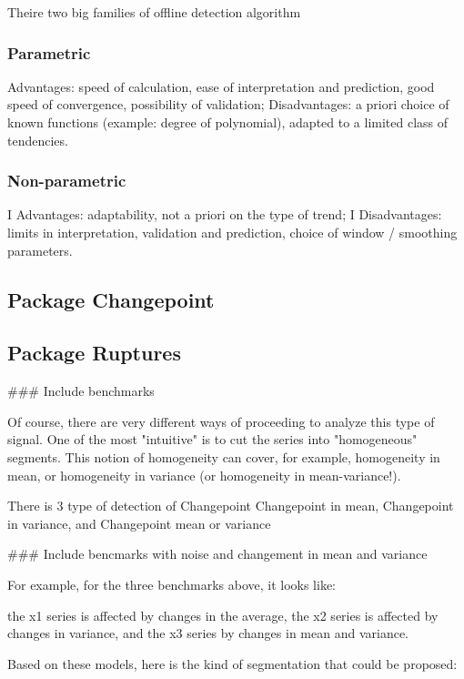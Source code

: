 \documentclass{article}
\begin{document}
 
Theire two big families of offline detection algorithm

\subsubsection{Parametric}

Advantages: speed of calculation, ease of interpretation and prediction,
good speed of convergence, possibility of validation;
Disadvantages: a priori choice of known functions (example: degree of polynomial), adapted to a limited class of tendencies.

\subsubsection{Non-parametric}


I Advantages: adaptability, not a priori on the type of trend;
I Disadvantages: limits in interpretation, validation and prediction,
choice of window / smoothing parameters.

\subsection{Package Changepoint}

\subsection{Package Ruptures}



\#\#\# Include benchmarks

Of course, there are very different ways of proceeding to analyze this type of signal. One of the most "intuitive" is to cut the series into "homogeneous" segments. This notion of homogeneity can cover, for example, homogeneity in mean, or homogeneity in variance (or homogeneity in mean-variance!).

There is 3 type of detection of Changepoint
Changepoint in mean, Changepoint in variance, and Changepoint mean or variance

\#\#\# Include bencmarks with noise and changement in mean and variance


For example, for the three benchmarks above, it looks like:

the x1 series is affected by changes in the average,
the x2 series is affected by changes in variance, and
the x3 series by changes in mean and variance.

Based on these models, here is the kind of segmentation that could be proposed:
\end{document}
